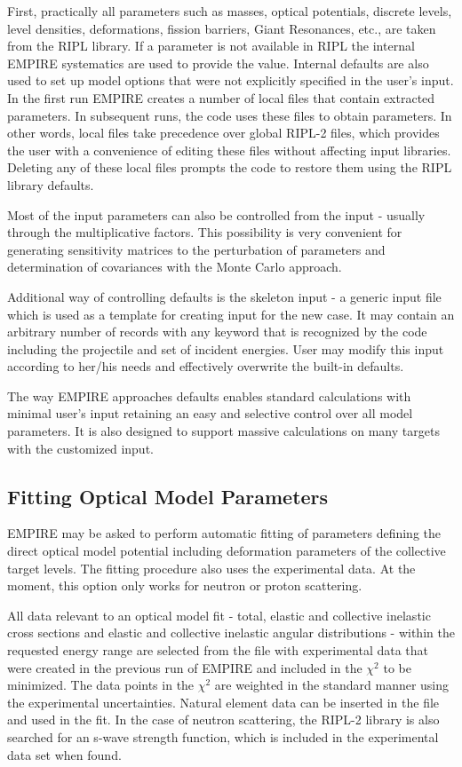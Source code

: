 \documentclass[twocolumn,amsmath,amssymb,10pt,groupedaddress,letter]{revtex4}
\begin{document}
First, practically all parameters such as masses, optical potentials, discrete levels, level densities, deformations, fission barriers, Giant Resonances, etc., are taken from the RIPL library. If a parameter is not available in RIPL the internal EMPIRE systematics are used to provide the value. Internal defaults are also used to set up model options that were not explicitly specified in the user's input. In the first run EMPIRE creates a number of local files that contain extracted parameters. In subsequent runs, the code uses these files to obtain parameters. In other words, local files take precedence over global RIPL-2 files, which provides the user with a convenience of editing these files without affecting input libraries. Deleting any of these local files prompts the code to restore them using the RIPL library defaults.

Most of the input parameters can also be controlled from the input - usually through the multiplicative factors. This possibility is very convenient for  generating sensitivity matrices to the perturbation of parameters and determination of covariances with the Monte Carlo approach.

Additional way of controlling defaults is the skeleton input - a generic input file which is used as a template for creating input for the new case. It may contain an arbitrary number of records with any keyword that is  recognized by the code including the projectile and set of incident energies. User may modify this input according to her/his needs and effectively overwrite the built-in defaults.

The way EMPIRE approaches defaults enables standard calculations with minimal user's input retaining an easy and selective control over all model parameters. It is also designed to support massive calculations on many targets with the customized input.

\subsection{Fitting Optical Model Parameters}
EMPIRE may be asked to perform automatic fitting of parameters defining the direct optical model potential including  deformation parameters of the collective target levels. The fitting procedure also uses the experimental data. At the moment, this option only works for neutron or proton scattering.

All data relevant to an optical model fit - total, elastic and collective inelastic cross sections and elastic and collective inelastic angular distributions - within the requested energy range are selected from the file with experimental data that were created in the previous run of EMPIRE and included in the $\chi^{2}$ to be minimized. The data points in the $\chi^{2}$ are weighted in the standard manner using the experimental uncertainties. Natural element data can be inserted in the file and used in the fit. In the case of neutron scattering, the RIPL-2 library is also searched for an s-wave strength function, which is included in the experimental data set when found.
\end{document}
